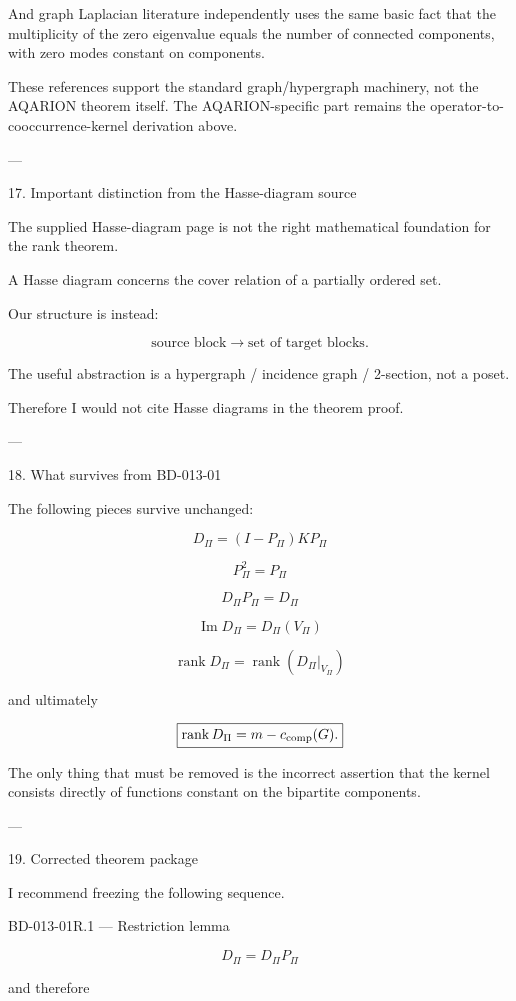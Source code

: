 And graph Laplacian literature independently uses the same basic fact that the multiplicity of the zero eigenvalue equals the number of connected components, with zero modes constant on components. 

These references support the standard graph/hypergraph machinery, not the AQARION theorem itself. The AQARION-specific part remains the operator-to-cooccurrence-kernel derivation above.


---

17. Important distinction from the Hasse-diagram source

The supplied Hasse-diagram page is not the right mathematical foundation for the rank theorem.

A Hasse diagram concerns the cover relation of a partially ordered set.

Our structure is instead:

\[
\text{source block}
\rightarrow
\text{set of target blocks}.
\]

The useful abstraction is a hypergraph / incidence graph / 2-section, not a poset.

Therefore I would not cite Hasse diagrams in the theorem proof.


---

18. What survives from BD-013-01

The following pieces survive unchanged:

\[
D_\Pi=(I-P_\Pi)KP_\Pi
\]

\[
P_\Pi^2=P_\Pi
\]

\[
D_\Pi P_\Pi=D_\Pi
\]

\[
\operatorname{Im}D_\Pi=D_\Pi(V_\Pi)
\]

\[
\operatorname{rank}D_\Pi
=
\operatorname{rank}(D_\Pi|_{V_\Pi})
\]

and ultimately

\[
\boxed{
\operatorname{rank}D_\Pi=m-c_{\rm comp}(G).
}
\]

The only thing that must be removed is the incorrect assertion that the kernel consists directly of functions constant on the bipartite components.


---

19. Corrected theorem package

I recommend freezing the following sequence.

BD-013-01R.1 — Restriction lemma

\[
\boxed{
D_\Pi=D_\Pi P_\Pi
}
\]

and therefore

